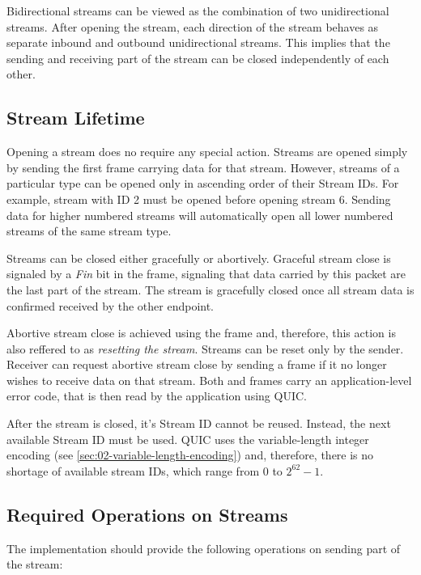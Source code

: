Bidirectional streams can be viewed as the combination of two unidirectional streams. After opening
the stream, each direction of the stream behaves as separate inbound and outbound unidirectional
streams. This implies that the sending and receiving part of the stream can be closed independently
of each other.

\subsection{Stream Lifetime}

Opening a stream does no require any special action. Streams are opened simply by sending the first
\STREAM{} frame carrying data for that stream. However, streams of a particular type can be opened
only in ascending order of their Stream IDs. For example, stream with ID 2 must be opened before
opening stream 6. Sending data for higher numbered streams will automatically open all lower
numbered streams of the same stream type.

Streams can be closed either gracefully or abortively. Graceful stream close is signaled by a
\textit{Fin} bit in the \STREAM{} frame, signaling that data carried by this packet are the last
part of the stream. The stream is gracefully closed once all stream data is confirmed received by
the other endpoint.

Abortive stream close is achieved using the \RESETSTREAM{} frame and, therefore, this action is also
reffered to as \textit{resetting the stream}. Streams can be reset only by the sender. Receiver can
request abortive stream close by sending a \STOPSENDING{} frame if it no longer wishes to receive
data on that stream. Both \RESETSTREAM{} and \STOPSENDING{} frames carry an application-level error
code, that is then read by the application using QUIC.

After the stream is closed, it's Stream ID cannot be reused. Instead, the next available Stream ID
must be used. QUIC uses the variable-length integer encoding (see
\autoref{sec:02-variable-length-encoding}) and, therefore, there is no shortage of available stream
IDs, which range from 0 to $2^{62}-1$.

\subsection{Required Operations on Streams}

The implementation should provide the following operations on sending part of the stream:

